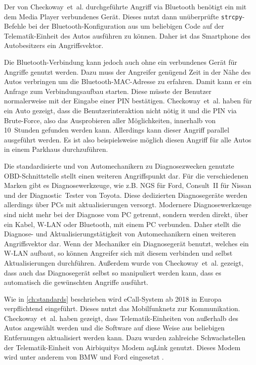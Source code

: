 Der von Checkoway~et~al. durchgeführte Angriff via Bluetooth benötigt ein
mit dem Media Player verbundenes Gerät. Dieses nutzt dann unüberprüfte
\verb+strcpy+-Befehle bei der Bluetooth-Konfiguration aus um beliebigen Code
auf der Telematik-Einheit des Autos ausführen zu können. Daher ist das
Smartphone des Autobesitzers ein Angriffsvektor.

Die Bluetooth-Verbindung kann jedoch auch ohne ein verbundenes Gerät für
Angriffe genutzt werden. Dazu muss der Angreifer genügend Zeit in der Nähe des
Autos verbringen um die Bluetooth-MAC-Adresse zu erfahren. Damit kann er ein
Anfrage zum Verbindungsaufbau starten. Diese müsste der Benutzer normalerweise
mit der Eingabe einer PIN bestätigen. Checkoway~et~al. haben für ein Auto
gezeigt, dass die Benutzerinteraktion nicht nötig it und die PIN via
Brute-Force, also das Ausprobieren aller Möglichkeiten, innerhalb von
10~Stunden gefunden werden kann. Allerdings kann dieser Angriff parallel
ausgeführt werden. Es ist also beispielsweise möglich diesen Angriff für alle
Autos in einem Parkhaus durchzuführen.

Die standardisierte und von Automechanikern zu Diagnosezwecken genutzte
OBD-Schnittstelle stellt einen weiteren Angriffspunkt dar. Für die
verschiedenen Marken gibt es Diagnosewerkzeuge, wie z.B. NGS für Ford,
Consult~II für Nissan und der Diagnostic~Tester von Toyota. Diese dedizierten
Diagnosegeräte werden allerdings über PCs mit aktualisierungen versorgt.
Modernere Diagnosewerkzeuge sind nicht mehr bei der Diagnose vom PC getrennt,
sondern werden direkt, über ein Kabel, W-LAN oder Bluetooth, mit einem PC
verbunden. Daher stellt die Diagnose- und Aktualisierungstätigkeit von
Automechanikern einen weiteren Angriffsvektor dar. Wenn der Mechaniker ein
Diagnosegerät benutzt, welches ein W-LAN aufbaut, so können Angreifer sich
mit diesem verbinden und selbst Aktualisierungen durchführen. Außerdem wurde
von Checkoway~et~al. gezeigt, dass auch das Diagnosegerät selbst so manipuliert
werden kann, dass es automatisch die gewünschten Angriffe ausführt.

Wie in \cref{ch:standards} beschrieben wird eCall-System ab 2018 in Europa
verpflichtend eingeführt. Dieses nutzt das Mobilfunknetz zur Kommunikation.
Checkoway~et~al. haben gezeigt, dass Telematik-Einheiten von außerhalb des
Autos angewählt werden und die Software auf diese Weise aus beliebigen
Entfernungen aktualisiert werden kann. Dazu wurden zahlreiche Schwachstellen
der Telematik-Einheit von Airbiquitys Modem aqLink genutzt. Dieses Modem wird
unter anderem von BMW und Ford eingesetzt \cite{AirbiquityBMW,AirbiquityFord}.

